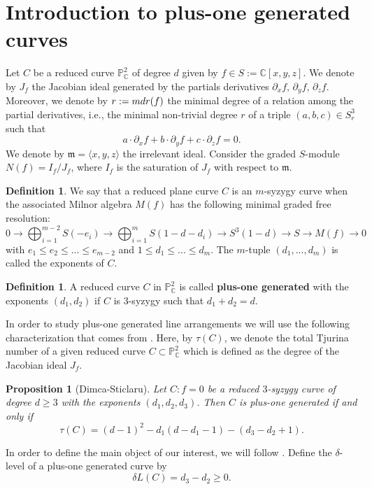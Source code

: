 \documentclass[12pt]{article}
\theoremstyle{plain}
\newtheorem{proposition}[thm]{Proposition}
\theoremstyle{definition}
\newtheorem{definition}[thm]{Definition}
\begin{document}
\section{Introduction to plus-one generated curves}
 Let $C$ be a reduced curve $\mathbb{P}^{2}_{\mathbb{C}}$ of degree $d$ given by $f \in S :=\mathbb{C}[x,y,z]$. We denote by $J_{f}$ the Jacobian ideal generated by the partials derivatives $\partial_{x}f, \, \partial_{y}f, \, \partial_{z}f$. Moreover, we denote by $r:={\rm mdr}(f)$ the minimal degree of a relation among the partial derivatives, i.e., the minimal non-trivial degree $r$ of a triple $(a,b,c) \in S_{r}^{3}$ such that 
$$a\cdot \partial_{x} f + b\cdot \partial_{y}f + c\cdot \partial_{z}f = 0.$$
We denote by $\mathfrak{m} = \langle x,y,z \rangle$ the irrelevant ideal. Consider the graded $S$-module $N(f) = I_{f} / J_{f}$, where $I_{f}$ is the saturation of $J_{f}$ with respect to $\mathfrak{m}$.
\begin{definition}
We say that a reduced plane curve $C$ is an $m$-syzygy curve when the associated Milnor algebra $M(f)$ has the following minimal graded free resolution:
$$0 \rightarrow \bigoplus_{i=1}^{m-2}S(-e_{i}) \rightarrow \bigoplus_{i=1}^{m}S(1-d - d_{i}) \rightarrow S^{3}(1-d)\rightarrow S \rightarrow M(f) \rightarrow 0$$
with $e_{1} \leq e_{2} \leq ... \leq e_{m-2}$ and $1\leq d_{1} \leq ... \leq d_{m}$. The $m$-tuple $(d_{1}, ..., d_{m})$ is called the exponents of $C$.
\end{definition}

\begin{definition}
A reduced curve $C$ in $\mathbb{P}^{2}_{\mathbb{C}}$ is called \textbf{plus-one generated} with the exponents $(d_1,d_2)$ if $C$ is $3$-syzygy such that $d_{1}+d_{2}=d$. 
\end{definition}
In order to study plus-one generated line arrangements we will use the following characterization that comes from \cite{DS0}. Here, by $\tau(C)$, we denote the total Tjurina number of a given reduced curve $C \subset \mathbb{P}^{2}_{\mathbb{C}}$ which is defined as the degree of the Jacobian ideal $J_{f}$.
\begin{proposition}[Dimca-Sticlaru]
\label{dimspl}
Let $C: f=0$ be a reduced $3$-syzygy curve of degree $d\geq 3$ with the exponents $(d_{1},d_{2},d_{3})$. Then $C$ is plus-one generated if and only if
$$\tau(C) = (d-1)^{2} - d_{1}(d-d_{1}-1) - (d_{3}-d_{2}+1).$$
\end{proposition}
\noindent
In order to define the main object of our interest, we will follow \cite{DS24}.
Define the $\delta$-level of a plus-one generated curve by
$$\delta L(C) = d_{3} - d_{2} \geq 0.$$
\end{document}
